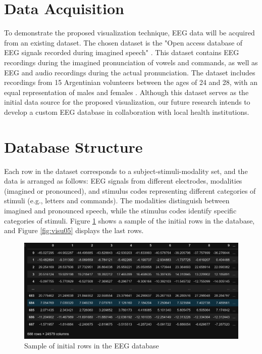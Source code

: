 \documentclass[format=sigconf]{acmart}
\begin{document}
	\section{Data Acquisition}
		\par To demonstrate the proposed visualization technique, EEG data will be acquired from an existing dataset. The chosen dataset is the "Open access database of EEG signals recorded during imagined speech" \cite{10.1117/12.2255697}. This dataset contains EEG recordings during the imagined pronunciation of vowels and commands, as well as EEG and audio recordings during the actual pronunciation. The dataset includes recordings from 15 Argentinian volunteers between the ages of 24 and 28, with an equal representation of males and females \cite{10.1117/12.2255697}. Although this dataset serves as the initial data source for the proposed visualization, our future research intends to develop a custom EEG database in collaboration with local health institutions.
	
	\section{Database Structure}
		\par Each row in the dataset corresponds to a subject-stimuli-modality set, and the data is arranged as follows: EEG signals from different electrodes, modalities (imagined or pronounced), and stimulus codes representing different categories of stimuli (e.g., letters and commands). The modalities distinguish between imagined and pronounced speech, while the stimulus codes identify specific categories of stimuli. Figure \ref{fig:visu04} shows a sample of the initial rows in the database, and Figure \ref{fig:visu05} displays the last rows.
		
		\begin{figure}[h]
			\centering
			\includegraphics[width=\linewidth]{../presentation/images/visu04}
			\caption{Sample of initial rows in the EEG database}
			\label{fig:visu04}
		\end{figure}
		
\end{document}
